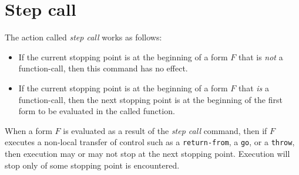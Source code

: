 \section{Step call}

The action called \emph{step call} works as follows:

\begin{itemize}
\item If the current stopping point is at the beginning of a form $F$
  that is \emph{not} a function-call, then this command has no effect.
\item If the current stopping point is at the beginning
  of a form $F$ that \emph{is} a function-call, then the next stopping
  point is at the beginning of the first form to be evaluated in the
  called function.
\end{itemize}

When a form $F$ is evaluated as a result of the \emph{step call}
command, then if $F$ executes a non-local transfer of control such as
a \texttt{return-from}, a \texttt{go}, or a \texttt{throw}, then
execution may or may not stop at the next stopping point.  Execution
will stop only of some stopping point is encountered.
